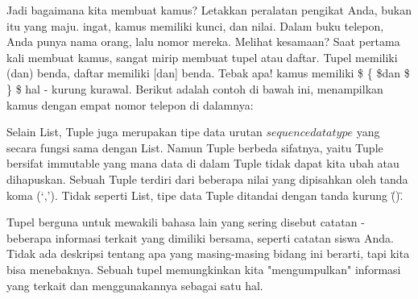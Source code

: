 Jadi bagaimana kita membuat kamus? Letakkan peralatan pengikat Anda, bukan itu yang maju. ingat, kamus memiliki kunci, dan nilai. Dalam buku telepon, Anda punya nama orang, lalu nomor mereka. Melihat kesamaan? Saat pertama kali membuat kamus, sangat mirip membuat tupel atau daftar. Tupel memiliki (dan) benda, daftar memiliki [dan] benda. Tebak apa! kamus memiliki \$  \{  \$dan \$  \}  \$ hal - kurung kurawal. Berikut adalah contoh di bawah ini, menampilkan kamus dengan empat nomor telepon di dalamnya: 

Selain List, Tuple juga merupakan tipe data urutan \(sequence data type\) yang secara fungsi sama dengan List. Namun Tuple berbeda sifatnya, yaitu Tuple bersifat immutable yang mana data di dalam Tuple tidak dapat kita ubah atau dihapuskan. Sebuah Tuple terdiri dari beberapa nilai yang dipisahkan oleh tanda koma (‘,’). Tidak seperti List, tipe data Tuple ditandai dengan tanda kurung \"()\".

Tupel berguna untuk mewakili bahasa lain yang sering disebut catatan - beberapa informasi terkait yang dimiliki bersama, seperti catatan siswa Anda. Tidak ada deskripsi tentang apa yang masing-masing bidang ini berarti, tapi kita bisa menebaknya. Sebuah tupel memungkinkan kita "mengumpulkan" informasi yang terkait dan menggunakannya sebagai satu hal.
